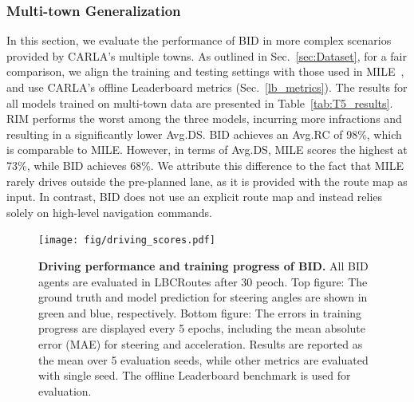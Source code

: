 \subsubsection{Multi-town Generalization}\label{sec:multi_towns_result}
\hspace{1pc}In this section, we evaluate the performance of BID in more complex scenarios provided by CARLA’s multiple towns. 
As outlined in Sec.~\ref{sec:Dataset}, for a fair comparison, we align the training and testing settings with those used in MILE~\cite{Hu:2022}, and use CARLA’s offline Leaderboard metrics (Sec.~\ref{lb_metrics}). 
The results for all models trained on multi-town data are presented in Table~\ref{tab:T5_results}. 
RIM performs the worst among the three models, incurring more infractions and resulting in a significantly lower Avg.DS. 
BID achieves an Avg.RC of 98\%, which is comparable to MILE. 
However, in terms of Avg.DS, MILE scores the highest at 73\%, while BID achieves 68\%. 
We attribute this difference to the fact that MILE rarely drives outside the pre-planned lane, as it is provided with the route map as input. 
In contrast, BID does not use an explicit route map and instead relies solely on high-level navigation commands.

\begin{figure}[t]
	\centering
	\texttt{[image: fig/driving\_scores.pdf]}
	\vspace{-1ex}
	\caption{\textbf{Driving performance and training progress of BID.} 
		All BID agents are evaluated in LBCRoutes after 30 peoch.
		Top figure: The ground truth and model prediction for steering angles are shown in green and blue, respectively.
		Bottom figure: The errors in training progress are displayed every 5 epochs, including the mean absolute error (MAE) for steering and acceleration.
		Results are reported as the mean over 5 evaluation seeds, while other metrics are evaluated with single seed. 
		The offline Leaderboard benchmark is used for evaluation.}
	\vspace{-1.5ex}
	\label{fig:score_eu_lb_tt_tn}
\end{figure}


